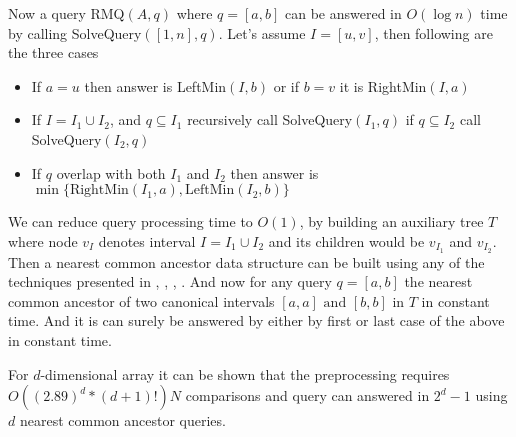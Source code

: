 Now a query RMQ\((A, q)\) where $q=[a,b]$ can be answered in $O(\log n)$ time by calling SolveQuery\(([1,n], q)\). Let's assume $I=[u,v]$, then following are the three cases
\compress
\begin{itemize}  \itemsep0pt \parskip0pt 
  \item If $a=u$ then answer is LeftMin\((I, b)\) or if $b=v$ it is RightMin\((I, a)\)
  \item If $I=I_1 \cup I_2$, and $q \subseteq I_1$ recursively call SolveQuery\((I_1, q)\) if $q \subseteq I_2$ call SolveQuery\((I_2, q)\)
  \item If $q$ overlap with both $I_1$ and $I_2$ then answer is $\min{\{\text{RightMin}(I_1,a),\text{LeftMin}(I_2, b)\}}$
\end{itemize}
We can reduce query processing time to $O(1)$, by building an auxiliary tree $T$ where node $v_I$ denotes interval $I=I_1 \cup I_2$ and its children would be $v_{I_1}$ and $v_{I_2}$. Then a nearest common ancestor data structure can be built using any of the techniques presented in \cite{p4}, \cite{p13}, \cite{p16}, \cite{p15}. And now for any query \(q=[a,b]\) the nearest common ancestor of two canonical intervals \( [a,a] \text{ and } [b,b] \) in $T$ in constant time. And it is can surely be answered by either by first or last case of the above in constant time.

For $d$-dimensional array it can be shown that the preprocessing requires $O((2.89)^d*(d+1)!)N$ comparisons and query can answered in $2^d-1$ using $d$ nearest common ancestor queries.

